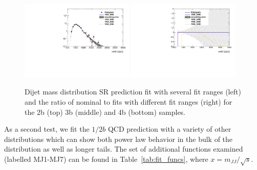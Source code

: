 \begin{figure}[htbp!]
\begin{center}
\includegraphics[width=0.48\textwidth,angle=-90]{figures/boosted/Syst_Smooth/smoothFuncRangeCompare_44_comp.pdf}
\includegraphics[width=0.48\textwidth,angle=-90]{figures/boosted/Syst_Smooth/smoothFuncRangeCompare_44_comp_ratio.pdf} \\
\caption{Dijet mass distribution SR prediction fit with several fit ranges (left) and the ratio of nominal to fits with different fit ranges (right)  for the 2b (top) 3b (middle) and 4b (bottom) samples. }
\label{fig:qcd_fit_range_sys_ratio-scaled}
\end{center}
\end{figure}

As a second test, we fit the $1/2b$ QCD prediction with a variety of other distributions which can show both power law behavior in the bulk of the distribution as well as longer tails.  The set of additional functions examined (labelled MJ1-MJ7) can be found in Table~\ref{tab:fit_funcs}, where $x = m_{JJ} / \sqrt{s}$.

